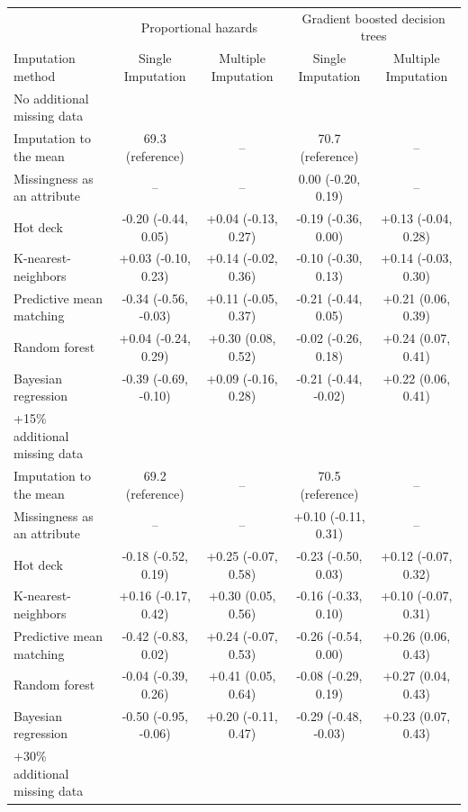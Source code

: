 \documentclass{article}
\begin{document}
\begin{table}
\begin{tabular}{lcccc}
\toprule
& \multicolumn{2}{c}{Proportional hazards} & \multicolumn{2}{c}{Gradient boosted decision trees} \\ 
 \cmidrule(lr){2-3}\cmidrule(lr){4-5}
Imputation method & Single Imputation & Multiple Imputation & Single Imputation & Multiple Imputation \\ 
\midrule
\multicolumn{1}{l}{No additional missing data} \\ 
\midrule
Imputation to the mean & 69.3 (reference) & -- & 70.7 (reference) & -- \\ 
Missingness as an attribute & -- & -- & 0.00 (-0.20, 0.19) & -- \\ 
Hot deck & -0.20 (-0.44, 0.05) & +0.04 (-0.13, 0.27) & -0.19 (-0.36, 0.00) & +0.13 (-0.04, 0.28) \\ 
K-nearest-neighbors & +0.03 (-0.10, 0.23) & +0.14 (-0.02, 0.36) & -0.10 (-0.30, 0.13) & +0.14 (-0.03, 0.30) \\ 
Predictive mean matching & -0.34 (-0.56, -0.03) & +0.11 (-0.05, 0.37) & -0.21 (-0.44, 0.05) & +0.21 (0.06, 0.39) \\ 
Random forest & +0.04 (-0.24, 0.29) & +0.30 (0.08, 0.52) & -0.02 (-0.26, 0.18) & +0.24 (0.07, 0.41) \\ 
Bayesian regression & -0.39 (-0.69, -0.10) & +0.09 (-0.16, 0.28) & -0.21 (-0.44, -0.02) & +0.22 (0.06, 0.41) \\ 
\midrule
\multicolumn{1}{l}{+15\% additional missing data} \\ 
\midrule
Imputation to the mean & 69.2 (reference) & -- & 70.5 (reference) & -- \\ 
Missingness as an attribute & -- & -- & +0.10 (-0.11, 0.31) & -- \\ 
Hot deck & -0.18 (-0.52, 0.19) & +0.25 (-0.07, 0.58) & -0.23 (-0.50, 0.03) & +0.12 (-0.07, 0.32) \\ 
K-nearest-neighbors & +0.16 (-0.17, 0.42) & +0.30 (0.05, 0.56) & -0.16 (-0.33, 0.10) & +0.10 (-0.07, 0.31) \\ 
Predictive mean matching & -0.42 (-0.83, 0.02) & +0.24 (-0.07, 0.53) & -0.26 (-0.54, 0.00) & +0.26 (0.06, 0.43) \\ 
Random forest & -0.04 (-0.39, 0.26) & +0.41 (0.05, 0.64) & -0.08 (-0.29, 0.19) & +0.27 (0.04, 0.43) \\ 
Bayesian regression & -0.50 (-0.95, -0.06) & +0.20 (-0.11, 0.47) & -0.29 (-0.48, -0.03) & +0.23 (0.07, 0.43) \\ 
\midrule
\multicolumn{1}{l}{+30\% additional missing data} \\ 

\end{tabular}
\end{table}
\end{document}

